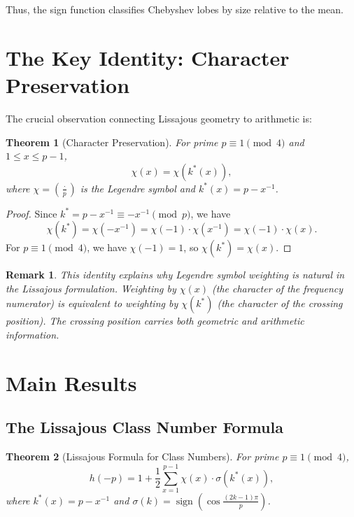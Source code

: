 \documentclass[11pt,a4paper]{article}
\newtheorem{theorem}{Theorem}
\newtheorem{remark}{Remark}
\begin{document}
Thus, the sign function classifies Chebyshev lobes by size relative to the mean.

\section{The Key Identity: Character Preservation}

The crucial observation connecting Lissajous geometry to arithmetic is:

\begin{theorem}[Character Preservation]\label{thm:chi-preservation}
For prime $p \equiv 1 \pmod 4$ and $1 \leq x \leq p-1$,
\[
\chi(x) = \chi(k^*(x)),
\]
where $\chi = \left(\frac{\cdot}{p}\right)$ is the Legendre symbol and $k^*(x) = p - x^{-1}$.
\end{theorem}

\begin{proof}
Since $k^* = p - x^{-1} \equiv -x^{-1} \pmod p$, we have
\[
\chi(k^*) = \chi(-x^{-1}) = \chi(-1) \cdot \chi(x^{-1}) = \chi(-1) \cdot \chi(x).
\]
For $p \equiv 1 \pmod 4$, we have $\chi(-1) = 1$, so $\chi(k^*) = \chi(x)$.
\end{proof}

\begin{remark}
This identity explains why Legendre symbol weighting is natural in the Lissajous formulation. Weighting by $\chi(x)$ (the character of the frequency numerator) is equivalent to weighting by $\chi(k^*)$ (the character of the crossing position). The crossing position carries both geometric and arithmetic information.
\end{remark}

\section{Main Results}

\subsection{The Lissajous Class Number Formula}

\begin{theorem}[Lissajous Formula for Class Numbers]\label{thm:main}
For prime $p \equiv 1 \pmod 4$,
\begin{equation}\label{eq:main}
h(-p) = 1 + \frac{1}{2} \sum_{x=1}^{p-1} \chi(x) \cdot \sigma(k^*(x)),
\end{equation}
where $k^*(x) = p - x^{-1}$ and $\sigma(k) = \operatorname{sign}(\cos\frac{(2k-1)\pi}{p})$.
\end{theorem}
\end{document}
